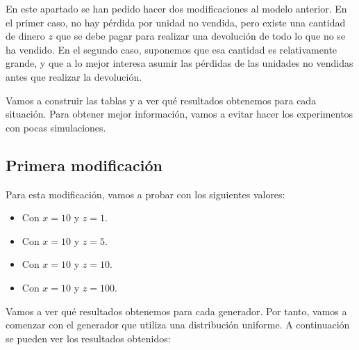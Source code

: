\documentclass[11pt,a4paper]{report}
\begin{document}
En este apartado se han pedido hacer dos modificaciones al modelo anterior. En el primer caso, no hay pérdida por unidad no
vendida, pero existe una cantidad de dinero $z$ que se debe pagar para realizar una devolución de todo lo que no se
ha vendido. En el segundo caso, suponemos que esa cantidad es relativamente grande, y que a lo mejor interesa asumir las pérdidas
de las unidades no vendidas antes que realizar la devolución.

Vamos a construir las tablas y a ver qué resultados obtenemos para cada situación. Para obtener mejor información, vamos a
evitar hacer los experimentos con pocas simulaciones.

\subsection{Primera modificación}

Para esta modificación, vamos a probar con los siguientes valores:

\begin{itemize}
	\item Con $x = 10$ y $z = 1$.
	\item Con $x = 10$ y $z = 5$.
	\item Con $x = 10$ y $z = 10$.
	\item Con $x = 10$ y $z = 100$.
\end{itemize}

Vamos a ver qué resultados obtenemos para cada generador. Por tanto, vamos a comenzar con el generador que utiliza
una distribución uniforme. A continuación se pueden ver los resultados obtenidos:
\end{document}
